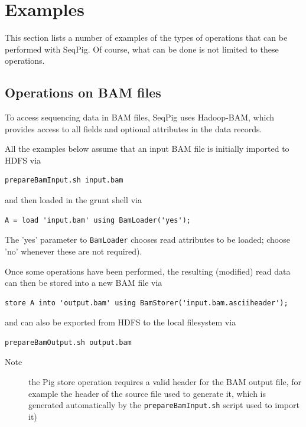 
\section{Examples}
\label{sect:examples}

This section lists a number of examples of the types of operations that can be
performed with SeqPig.  Of course, what can be done is not limited to these
operations.

\subsection{Operations on BAM files}

To access sequencing data in BAM files, SeqPig uses Hadoop-BAM, which provides
access to all fields and optional attributes in the data records.


All the examples below assume that an input BAM file is initially imported to HDFS via
\begin{lstlisting} 
prepareBamInput.sh input.bam
\end{lstlisting} 
and then loaded in the grunt shell via
\begin{lstlisting} 
A = load 'input.bam' using BamLoader('yes');
\end{lstlisting} 
The 'yes' parameter to {\tt BamLoader} chooses read attributes to be loaded; choose 'no' whenever these
are not required).

Once some operations have been performed, the resulting (modified) read
data can then be stored into a new BAM file via
\begin{lstlisting}
store A into 'output.bam' using BamStorer('input.bam.asciiheader');
\end{lstlisting}
and can also be exported from HDFS to the local filesystem via
\begin{lstlisting}
prepareBamOutput.sh output.bam
\end{lstlisting}
\begin{description}
	\item[Note] the Pig store operation requires a valid header for the BAM output file,
for example the header of the source file used to generate it, which is
generated automatically by the {\tt prepareBamInput.sh} script used to import it)
\end{description}

